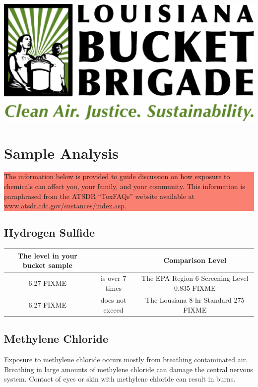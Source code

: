 \documentclass{article}
\newcommand{\fc}{\cellcolor{red}}
\newcommand{\highlightbox}[1]{\colorbox{salmon}{\parbox{\linewidth}{#1}}}
\newcommand{\outunits}      {FIXME}
\begin{document}
\newpage
\includegraphics{logo}
\section*{Sample Analysis}

\highlightbox{The information below is provided to guide discussion on how
exposure to chemicals can affect you, your family, and your
community. This information is paraphrased from the ATSDR “ToxFAQs”
website available at www.atsdr.cdc.gov/sustances/index.asp.}

\subsection*{Hydrogen Sulfide}


\begin{tabular}{|c|c|c|}
\hline
The level in your bucket sample &                             & Comparison Level                                       \\
\hline
\fc 6.27 \outunits              & \fc is over 7 times         & \fc The EPA Region 6 Screening Level 0.835 \outunits   \\
\hline
6.27 \outunits                  & does not exceed             & The Lousiana 8-hr Standard 275 \outunits               \\
\hline
\end{tabular}

\subsection*{Methylene Chloride}

Exposure to methylene chloride occurs mostly from breathing
contaminated air. Breathing in large amounts of methylene chloride can
damage the central nervous system. Contact of eyes or skin with
methylene chloride can result in burns.
\end{document}
